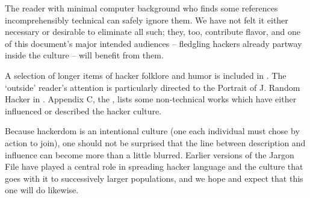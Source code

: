The reader with minimal computer background who finds some references incomprehensibly technical can safely ignore them. We have not
felt it either necessary or desirable to eliminate all such; they, too, contribute flavor, and one of this document's major intended
audiences -- fledgling hackers already partway inside the culture -- will benefit from them.

A selection of longer items of hacker folklore and humor is included in . The `outside' reader's attention is
particularly directed to the Portrait of J. Random Hacker in . Appendix C, the , lists
some non-technical works which have either influenced or described the hacker culture.

Because hackerdom is an intentional culture (one each individual must chose by action to join), one should not be surprised that the
line between description and influence can become more than a little blurred. Earlier versions of the Jargon File have played a central
role in spreading hacker language and the culture that goes with it to successively larger populations, and we hope and expect that
this one will do likewise.

